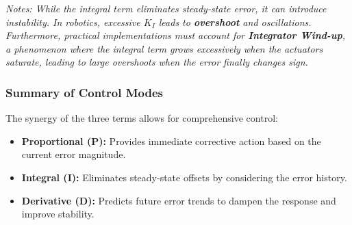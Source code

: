\begin{framed}
\noindent \textit{Notes: While the integral term eliminates steady-state error, it can introduce instability. 
In robotics, excessive $K_I$ leads to \textbf{overshoot} and oscillations. Furthermore, practical implementations must account 
for \textbf{Integrator Wind-up}, a phenomenon where the integral term grows excessively when the actuators saturate, 
leading to large overshoots when the error finally changes sign.}
\end{framed}

\subsubsection{Summary of Control Modes}
The synergy of the three terms allows for comprehensive control:
\begin{itemize}
    \item \textbf{Proportional (P):} Provides immediate corrective action based on the current error magnitude.
    \item \textbf{Integral (I):} Eliminates steady-state offsets by considering the error history.
    \item \textbf{Derivative (D):} Predicts future error trends to dampen the response and improve stability.
\end{itemize}